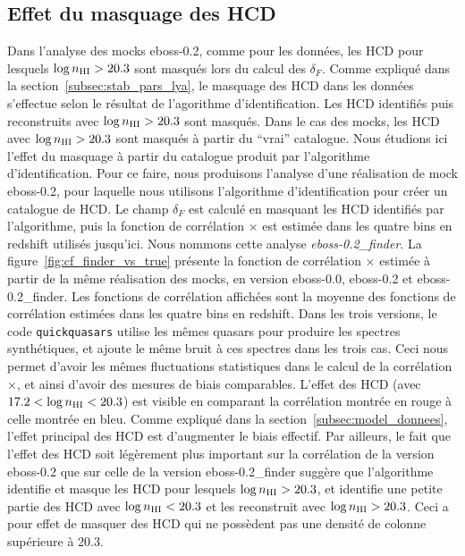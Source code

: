 \documentclass[11pt, twoside, a4paper, openright]{report}
\begin{document}
\subsection{Effet du masquage des HCD}
\label{subsec:effet_masquage_hcd}
Dans l'analyse des mocks eboss-0.2, comme pour les données, les HCD pour lesquels $\log n_{\textsc{HI}} > \num{20.3}$ sont masqués lors du calcul des $\delta_F$.
Comme expliqué dans la section~\ref{subsec:stab_pars_lya}, le masquage des HCD dans les données s'effectue selon le résultat de l'agorithme d'identification. Les HCD identifiés puis reconstruits avec $\log n_{\textsc{HI}} > \num{20.3}$ sont masqués. Dans le cas des mocks, les HCD avec $\log n_{\textsc{HI}} > \num{20.3}$ sont masqués à partir du ``vrai'' catalogue. Nous étudions ici l'effet du masquage à partir du catalogue produit par l'algorithme d'identification.
Pour ce faire, nous produisons l'analyse d'une réalisation de mock eboss-0.2, pour laquelle nous utilisons l'algorithme d'identification pour créer un catalogue de HCD. Le champ $\delta_F$ est calculé en masquant les HCD identifiés par l'algorithme, puis la fonction de corrélation \lya{}$\times$\lya{} est estimée dans les quatre bins en redshift utilisés jusqu'ici. Nous nommons cette analyse \emph{eboss-0.2\_finder}.
La figure~\ref{fig:cf_finder_vs_true} présente la fonction de corrélation \lya{}$\times$\lya{} estimée à partir de la même réalisation des mocks, en version eboss-0.0, eboss-0.2 et eboss-0.2\_finder.
Les fonctions de corrélation affichées sont la moyenne des fonctions de corrélation estimées dans les quatre bins en redshift.
Dans les trois versions, le code \texttt{quickquasars} utilise les mêmes quasars pour produire les spectres synthétiques, et ajoute le même bruit à ces spectres dans les trois cas. Ceci nous permet d'avoir les mêmes fluctuations statistiques dans le calcul de la corrélation \lya{}$\times$\lya{}, et ainsi d'avoir des mesures de biais comparables.
L'effet des HCD (avec $\num{17.2} < \log n_{\textsc{HI}} < \num{20.3}$) est visible en comparant la corrélation montrée en rouge à celle montrée en bleu. Comme expliqué dans la section~\ref{subsec:model_donnees}, l'effet principal des HCD est d'augmenter le biais effectif.
Par ailleurs, le fait que l'effet des HCD soit légèrement plus important sur la corrélation de la version eboss-0.2 que sur celle de la version  eboss-0.2\_finder suggère que l'algorithme identifie et masque les HCD pour lesquels $\log n_{\textsc{HI}} > \num{20.3}$, et identifie une petite partie des HCD avec $\log n_{\textsc{HI}} < \num{20.3}$ et les reconstruit avec $\log n_{\textsc{HI}} > \num{20.3}$. Ceci a pour effet de masquer des HCD qui ne possèdent pas une densité de colonne supérieure à \num{20.3}.
\end{document}
